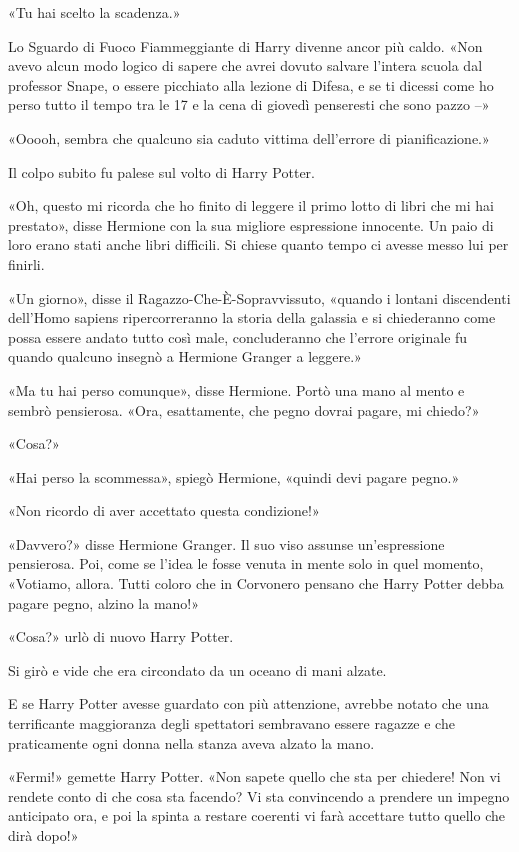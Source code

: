 «Tu hai scelto la scadenza.»

Lo Sguardo di Fuoco Fiammeggiante di Harry divenne ancor più caldo. «Non avevo alcun modo logico di sapere che avrei dovuto salvare l’intera scuola dal professor Snape, o essere picchiato alla lezione di Difesa, e se ti dicessi come ho perso tutto il tempo tra le 17 e la cena di giovedì penseresti che sono pazzo –»

«Ooooh, sembra che qualcuno sia caduto vittima dell’errore di pianificazione.»

Il colpo subito fu palese sul volto di Harry Potter.

«Oh, questo mi ricorda che ho finito di leggere il primo lotto di libri che mi hai prestato», disse Hermione con la sua migliore espressione innocente. Un paio di loro erano stati anche libri difficili. Si chiese quanto tempo ci avesse messo lui per finirli.

«Un giorno», disse il Ragazzo-Che-È-Sopravvissuto, «quando i lontani discendenti dell’Homo sapiens ripercorreranno la storia della galassia e si chiederanno come possa essere andato tutto così male, concluderanno che l’errore originale fu quando qualcuno insegnò a Hermione Granger a leggere.»

«Ma tu hai perso comunque», disse Hermione. Portò una mano al mento e sembrò pensierosa. «Ora, esattamente, che pegno dovrai pagare, mi chiedo?»

«Cosa?»

«Hai perso la scommessa», spiegò Hermione, «quindi devi pagare pegno.»

«Non ricordo di aver accettato questa condizione!»

«Davvero?» disse Hermione Granger. Il suo viso assunse un’espressione pensierosa. Poi, come se l’idea le fosse venuta in mente solo in quel momento, «Votiamo, allora. Tutti coloro che in Corvonero pensano che Harry Potter debba pagare pegno, alzino la mano!»

«Cosa?» urlò di nuovo Harry Potter.

Si girò e vide che era circondato da un oceano di mani alzate.

E se Harry Potter avesse guardato con più attenzione, avrebbe notato che una terrificante maggioranza degli spettatori sembravano essere ragazze e che praticamente ogni donna nella stanza aveva alzato la mano.

«Fermi!» gemette Harry Potter. «Non sapete quello che sta per chiedere! Non vi rendete conto di che cosa sta facendo? Vi sta convincendo a prendere un impegno anticipato ora, e poi la spinta a restare coerenti vi farà accettare tutto quello che dirà dopo!»

